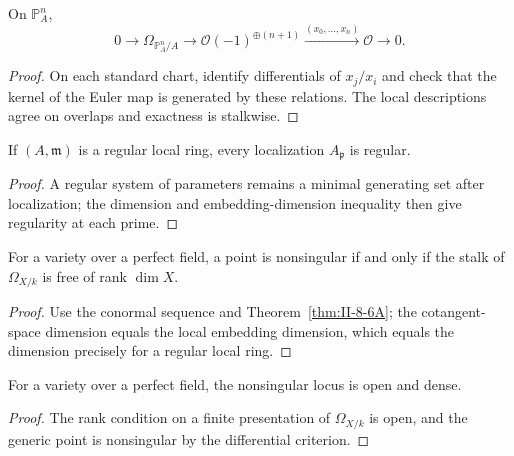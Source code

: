\begin{theorem}
\label{thm:II-8-13}
On $\mathbb P^n_A$,
\[
0\to\Omega_{\mathbb P^n_A/A}\to\mathcal O(-1)^{\oplus(n+1)}
\xrightarrow{(x_0,\ldots,x_n)}\mathcal O\to0.
\]
\end{theorem}
\begin{proof}
On each standard chart, identify differentials of $x_j/x_i$ and check that the kernel of the Euler
map is generated by these relations. The local descriptions agree on overlaps and exactness is
stalkwise.
\end{proof}

\begin{theorem}
\label{thm:II-8-14A}
If $(A,\mathfrak m)$ is a regular local ring, every localization $A_\mathfrak p$ is regular.
\end{theorem}
\begin{proof}
A regular system of parameters remains a minimal generating set after localization; the
dimension and embedding-dimension inequality then give regularity at each prime.
\end{proof}

\begin{theorem}
\label{thm:II-8-15}
For a variety over a perfect field, a point is nonsingular if and only if the stalk of
$\Omega_{X/k}$ is free of rank $\dim X$.
\end{theorem}
\begin{proof}
Use the conormal sequence and Theorem~\ref{thm:II-8-6A}; the cotangent-space dimension equals
the local embedding dimension, which equals the dimension precisely for a regular local ring.
\end{proof}

\begin{corollary}
\label{cor:II-8-16}
For a variety over a perfect field, the nonsingular locus is open and dense.
\end{corollary}
\begin{proof}
The rank condition on a finite presentation of $\Omega_{X/k}$ is open, and the generic point is
nonsingular by the differential criterion.
\end{proof}

